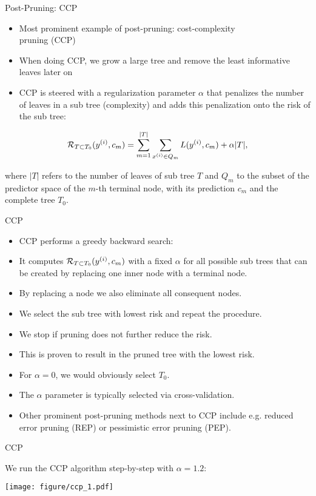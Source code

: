\documentclass[11pt,compress,t,notes=noshow, xcolor=table]{beamer}
\begin{document}
\begin{vbframe}{Post-Pruning: CCP}
\begin{itemize}
\item Most prominent example of post-pruning: cost-complexity \\ pruning (CCP)
\item When doing CCP, we grow a large tree and remove the least informative leaves later on
\item CCP is steered with a regularization parameter $\alpha$ that penalizes the number of leaves in a sub tree (complexity) and adds this penalization onto the risk of the sub tree:
\end{itemize}

$$\mathcal{R}_{T \subset T_0}(y^{(i)}, c_m) = \sum_{m=1}^{|T|} \sum_{x^{(i)} \in Q_m} L(y^{(i)}, c_m) + \alpha |T|,$$

where $|T|$ refers to the number of leaves of sub tree $T$ and $Q_m$ to the subset of the predictor space of the $m$-th terminal node, with its prediction $c_m$ and the complete tree $T_0$.

\end{vbframe}

\begin{vbframe}{CCP}
\begin{itemize}
\item CCP performs a greedy backward search:
\item It computes $\mathcal{R}_{T \subset T_0}(y^{(i)}, c_m)$ with a fixed $\alpha$ for all possible sub trees that can be created by replacing one inner node with a terminal node.
\item By replacing a node we also eliminate all consequent nodes.
\item We select the sub tree with lowest risk and repeat the procedure.
\item We stop if pruning does not further reduce the risk.
\item This is proven to result in the pruned tree with the lowest risk.
\item For $\alpha = 0$, we would obviously select $T_0$.
\item The $\alpha$ parameter is typically selected via cross-validation.
\item Other prominent post-pruning methods next to CCP include e.g. reduced error pruning (REP) or pessimistic error pruning (PEP).
\end{itemize}
\end{vbframe}


\begin{frame}{CCP}

We run the CCP algorithm step-by-step with $\alpha = 1.2$:
\vspace{0.25cm}

\color{fgcolor}

{\centering \texttt{[image: figure/ccp\_1.pdf]} 

}

\end{frame}
\end{document}

